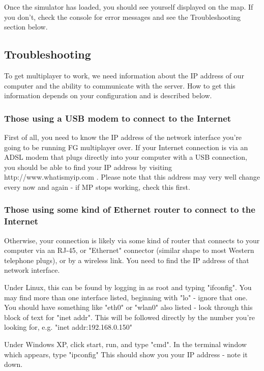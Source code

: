 Once the simulator has loaded, you should see yourself displayed on the map. If you don't, check the
console for error messages and see the Troubleshooting section below.

\subsection{Troubleshooting}

To get multiplayer to work, we need information about the IP address of our computer and the
ability to communicate with the server. How to get this information depends on your configuration and is described below.

\subsubsection{Those using a USB modem to connect to the Internet}

First of all, you need to know the IP address of the network interface you're going to be running FG multiplayer over.
If your Internet connection is via an ADSL modem that plugs directly into your computer with a USB connection, you
should be able to find your IP address by visiting http://www.whatismyip.com . Please note that this address may very well
change every now and again - if MP stops working, check this first.

\subsubsection{Those using some kind of Ethernet router to connect to the Internet}

Otherwise, your connection is likely via some kind of router that connects to your computer via an RJ-45, or "Ethernet" connector
(similar shape to most Western telephone plugs), or by a wireless link. You need to find the IP address of that network interface.

Under Linux, this can be found by logging in as root and typing "ifconfig". You may find more than one interface listed,
beginning with "lo" - ignore that one. You should have something like "eth0" or "wlan0" also listed - look through this block
of text for "inet addr". This will be followed directly by the number you're looking for, e.g. "inet addr:192.168.0.150"

Under Windows XP, click start, run, and type "cmd". In the terminal window which appears, type "ipconfig"
This should show you your IP address - note it down.


